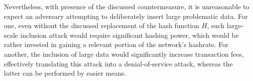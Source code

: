 \documentclass[a4paper,11pt,titlepage]{scrbook}
\begin{document}


Nevertheless, with presence of the discussed countermeasure, it is unreasonable to expect an adversary attempting to deliberately insert large problematic data.
For one, even without the discussed replacement of the hash function $H$, such large-scale inclusion attack would require significant hashing power, which would be rather invested in gaining a relevant portion of the network's hashrate.
For another, the inclusion of large data would significantly increase transaction fees, effectively translating this attack into a denial-of-service attack, whereas the latter can be performed by easier means.





\backmatter

\listoffigures
\cleardoublepage
{}
\listoftables

\cleardoublepage
\printbibliography

												  

%
\end{document}
